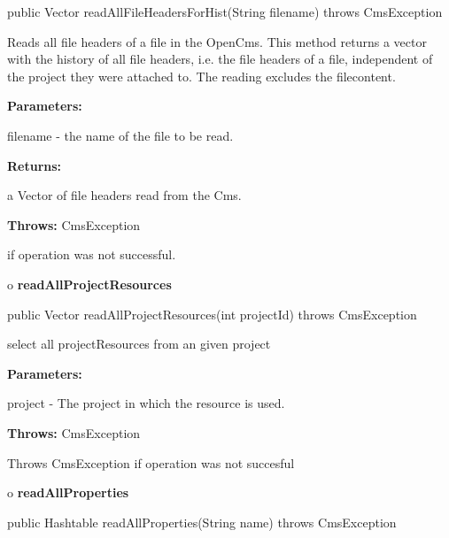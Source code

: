 \begin{PRE}
 public Vector readAllFileHeadersForHist(String filename) throws CmsException
\end{PRE}

\begin{description}
\htmlDD Reads all file headers of a file in the OpenCms. \htmlBR
This method returns a vector with the history of all file headers, i.e. the
file headers of a file, independent of the project they were attached
to.\htmlBR
The reading excludes the filecontent.

\begin{description}
\item {\bf Parameters:}

filename - the name of the file to be read.
\item {\bf Returns:}

a Vector of file headers read from the Cms.
\item {\bf Throws:} CmsException

if operation was not successful.
\end{description}

\end{description}

o {\bf readAllProjectResources}

\begin{PRE}
 public Vector readAllProjectResources(int projectId) throws CmsException
\end{PRE}

\begin{description}
\htmlDD select all projectResources from an given project

\begin{description}
\item {\bf Parameters:}

project - The project in which the resource is used.
\item {\bf Throws:} CmsException

Throws CmsException if operation was not succesful
\end{description}

\end{description}

o {\bf readAllProperties}

\begin{PRE}
 public Hashtable readAllProperties(String name) throws CmsException
\end{PRE}

